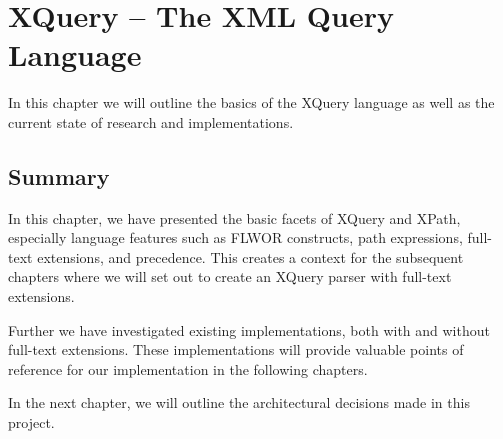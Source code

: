 \chapter{XQuery -- The XML Query Language}
\label{chapter:theory}
In this chapter we will outline the basics of the XQuery language as well as the
current state of research and implementations. 




\section{Summary}
In this chapter, we have presented the basic facets of XQuery and XPath,
especially language features such as FLWOR constructs, path expressions, 
full-text extensions, and precedence. This creates a context for the subsequent
chapters where we will set out to create an XQuery parser with full-text
extensions. 

Further we have investigated existing implementations, both with and without
full-text extensions. These implementations will provide valuable points of
reference for our implementation in the following chapters.

In the next chapter, we will outline the architectural decisions made in this
project.